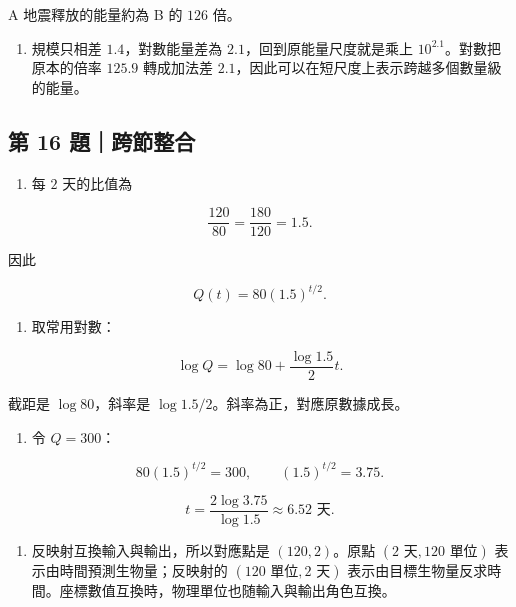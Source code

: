 \documentclass[11pt,a4paper]{article}
\providecommand{\tightlist}{%
  \setlength{\itemsep}{0pt}\setlength{\parskip}{0pt}}
\begin{document}
A 地震釋放的能量約為 B 的 \(126\) 倍。

\begin{enumerate}
\def\labelenumi{(\alph{enumi})}
\setcounter{enumi}{2}
\tightlist
\item
  規模只相差 \(1.4\)，對數能量差為 \(2.1\)，回到原能量尺度就是乘上 \(10^{2.1}\)。對數把原本的倍率 \(125.9\) 轉成加法差 \(2.1\)，因此可以在短尺度上表示跨越多個數量級的能量。
\end{enumerate}

\subsection{第 16 題｜跨節整合}\label{ux7b2c-16-ux984cux8de8ux7bc0ux6574ux5408}

\begin{enumerate}
\def\labelenumi{(\alph{enumi})}
\tightlist
\item
  每 \(2\) 天的比值為
\end{enumerate}

\[
\frac{120}{80}=\frac{180}{120}=1.5.
\]

因此

\[
Q(t)=80(1.5)^{t/2}.
\]

\begin{enumerate}
\def\labelenumi{(\alph{enumi})}
\setcounter{enumi}{1}
\tightlist
\item
  取常用對數：
\end{enumerate}

\[
\log Q=\log80+\frac{\log1.5}{2}t.
\]

截距是 \(\log80\)，斜率是 \(\log1.5/2\)。斜率為正，對應原數據成長。

\begin{enumerate}
\def\labelenumi{(\alph{enumi})}
\setcounter{enumi}{2}
\tightlist
\item
  令 \(Q=300\)：
\end{enumerate}

\[
80(1.5)^{t/2}=300,\qquad
(1.5)^{t/2}=3.75.
\]

\[
t=\frac{2\log3.75}{\log1.5}\approx6.52\text{ 天}.
\]

\begin{enumerate}
\def\labelenumi{(\alph{enumi})}
\setcounter{enumi}{3}
\tightlist
\item
  反映射互換輸入與輸出，所以對應點是 \((120,2)\)。原點 \((2\text{ 天},120\text{ 單位})\) 表示由時間預測生物量；反映射的 \((120\text{ 單位},2\text{ 天})\) 表示由目標生物量反求時間。座標數值互換時，物理單位也随輸入與輸出角色互換。
\end{enumerate}
\end{document}
